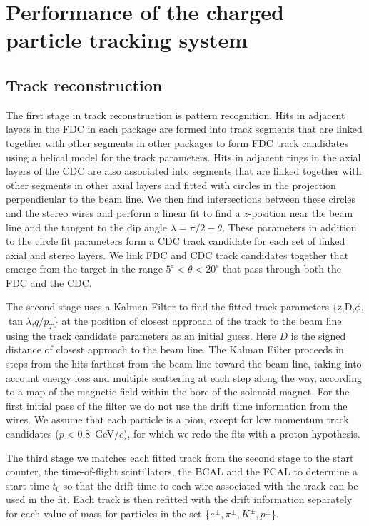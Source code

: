 \section[Performance of the charged particle tracking system (Simon)]{Performance of the charged particle tracking system \label{sec:trackingperformance}}
\subsection{Track reconstruction}

The first stage in track reconstruction is pattern recognition.  Hits in adjacent
 layers in the FDC in each package are formed into track segments that are 
linked together with other segments in other packages to form FDC track 
candidates using a helical model for the track parameters.
Hits in adjacent rings in the axial layers of the CDC are also associated into 
segments that are linked together with other segments in other axial layers
and fitted with circles in the projection perpendicular to the beam line. We 
then find intersections between these circles and the stereo wires and perform 
a linear fit to find a $z$-position near the beam line and the tangent to the dip
 angle $\lambda=\pi/2-\theta$.  These parameters in addition to the circle fit 
parameters form a CDC track candidate for each set of linked axial and stereo 
layers.   We link FDC and CDC track candidates together that emerge from the 
target in the range $5^\circ < \theta < 20^\circ$ that pass through both the FDC 
and the CDC.

The second stage uses a Kalman Filter \cite{KalmanFilter, KalmanFilter2} to find the fitted track parameters
\{z,D,$\phi$,$\tan\lambda$,$q/p_T$\}
at the position of closest approach of the track to the beam line using the 
track candidate parameters as an initial guess.  Here $D$ is the signed 
distance of closest approach to the beam line.  The Kalman Filter proceeds in 
steps from
the hits farthest from the beam line toward the beam line, taking into account
energy loss and multiple scattering at each step along the way, according to
a map of the magnetic field within the bore of the solenoid magnet.  For the 
first 
initial pass of the filter we do not use the drift time information from the 
wires.  We assume that each particle is a pion, except for low momentum track 
candidates ($p < 0.8$~GeV/$c$), for which we redo the fits with a proton hypothesis.

The third stage we matches each fitted track from the second 
stage to the start counter, the time-of-flight scintillators, the BCAL and the 
FCAL to determine a start time $t_0$ so that the drift time to each wire 
associated with the track can be used in the fit.  Each track is then refitted with
the drift information separately for each value of mass for particles in the set \{$e^\pm,\pi^\pm,K^\pm,p^\pm$\}.




